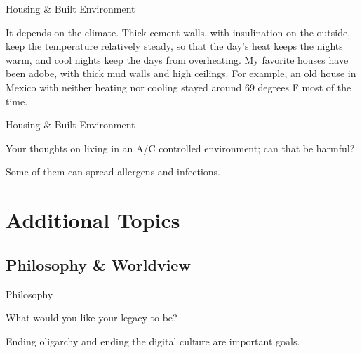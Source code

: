 \documentclass[11pt,oneside,openany,extrafontsizes]{memoir}
\begin{document}
\begin{standalonequote}{Housing \& Built Environment}

    \begin{answer}
      It depends on the climate. Thick cement walls, with insulination on the outside, keep the temperature relatively steady, so that the day's heat keeps the nights warm, and cool nights keep the days from overheating. My favorite houses have been adobe, with thick mud walls and high ceilings. For example, an old house in Mexico with neither heating nor cooling stayed around 69 degrees F most of the time.
    \end{answer}
\end{standalonequote}

\begin{qaexchange}{Housing \& Built Environment}

    \begin{question}
        Your thoughts on living in an A/C controlled environment; can that be harmful?
    \end{question}

    \begin{answer}
      Some of them can spread allergens and infections.
    \end{answer}
\end{qaexchange}

\chapter{Additional Topics}

\section{Philosophy \& Worldview}

\begin{qaexchange}{Philosophy}

    \begin{question}
        What would you like your legacy to be?
    \end{question}

    \begin{answer}
        Ending oligarchy and ending the digital culture are important goals.
    \end{answer}
\end{qaexchange}
\end{document}
